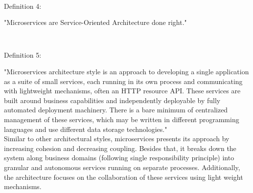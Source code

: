 \\
\begin{shaded}Definition 4: \cite{Fowler:2014aa}\cite{Radchenko:2015aa}\end{shaded}
"Microservices are Service-Oriented Architecture done right."


\\
\begin{shaded}Definition 5: \cite{Fowler:2014aa}\end{shaded}
"Microservices architecture style is an approach to developing a single application as a suite of small services, each running in its own process and communicating with lightweight mechanisms, often an HTTP resource API. These services are built around business capabilities and independently deployable by fully automated deployment machinery. There is a bare minimum of centralized management of these services, which may be written in different programming languages and use different data storage technologies."
\\
Similar to other architectural styles, microservices presents its approach by increasing cohesion and decreasing coupling. Besides that, it breaks down the system along business domains (following single responsibility principle) into granular and autonomous services running on separate processes. Additionally, the architecture focuses on the collaboration of these services using light weight mechanisms.

